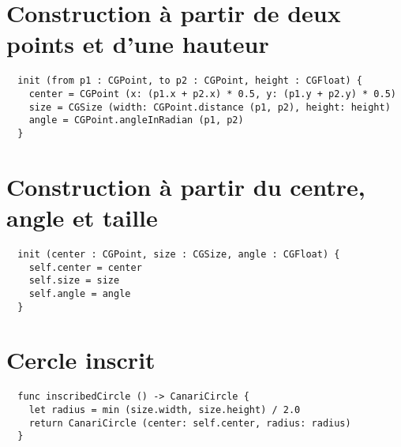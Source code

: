 \section{Construction à partir de deux points et d'une hauteur}

\begin{center}
\end{center}


\begin{lstlisting}
  init (from p1 : CGPoint, to p2 : CGPoint, height : CGFloat) {
    center = CGPoint (x: (p1.x + p2.x) * 0.5, y: (p1.y + p2.y) * 0.5)
    size = CGSize (width: CGPoint.distance (p1, p2), height: height)
    angle = CGPoint.angleInRadian (p1, p2)
  }
\end{lstlisting}






\section{Construction à partir du centre, angle et taille}

\begin{lstlisting}
  init (center : CGPoint, size : CGSize, angle : CGFloat) {
    self.center = center
    self.size = size
    self.angle = angle
  }
\end{lstlisting}






\section{Cercle inscrit}

\begin{center}
\end{center}

\begin{lstlisting}
  func inscribedCircle () -> CanariCircle {
    let radius = min (size.width, size.height) / 2.0
    return CanariCircle (center: self.center, radius: radius)
  }
\end{lstlisting}






